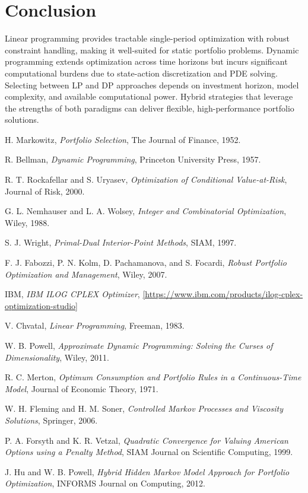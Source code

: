\documentclass{article}
\begin{document}
\section{Conclusion}
Linear programming provides tractable single-period optimization with robust constraint handling, making it well-suited for static portfolio problems. Dynamic programming extends optimization across time horizons but incurs significant computational burdens due to state-action discretization and PDE solving. Selecting between LP and DP approaches depends on investment horizon, model complexity, and available computational power. Hybrid strategies that leverage the strengths of both paradigms can deliver flexible, high-performance portfolio solutions.


\begin{thebibliography}{99}

H. Markowitz,
\textit{Portfolio Selection},
The Journal of Finance, 1952.

R. Bellman,
\textit{Dynamic Programming},
Princeton University Press, 1957.

R. T. Rockafellar and S. Uryasev,
\textit{Optimization of Conditional Value-at-Risk},
Journal of Risk, 2000.

G. L. Nemhauser and L. A. Wolsey,
\textit{Integer and Combinatorial Optimization},
Wiley, 1988.

S. J. Wright,
\textit{Primal-Dual Interior-Point Methods},
SIAM, 1997.

F. J. Fabozzi, P. N. Kolm, D. Pachamanova, and S. Focardi,
\textit{Robust Portfolio Optimization and Management},
Wiley, 2007.

IBM,
\textit{IBM ILOG CPLEX Optimizer},
\url{[https://www.ibm.com/products/ilog-cplex-optimization-studio]}

V. Chvatal,
\textit{Linear Programming},
Freeman, 1983.

W. B. Powell,
\textit{Approximate Dynamic Programming: Solving the Curses of Dimensionality},
Wiley, 2011.

R. C. Merton,
\textit{Optimum Consumption and Portfolio Rules in a Continuous-Time Model},
Journal of Economic Theory, 1971.

W. H. Fleming and H. M. Soner,
\textit{Controlled Markov Processes and Viscosity Solutions},
Springer, 2006.

P. A. Forsyth and K. R. Vetzal,
\textit{Quadratic Convergence for Valuing American Options using a Penalty Method},
SIAM Journal on Scientific Computing, 1999.

J. Hu and W. B. Powell,
\textit{Hybrid Hidden Markov Model Approach for Portfolio Optimization},
INFORMS Journal on Computing, 2012.

\end{thebibliography}
\end{document}
